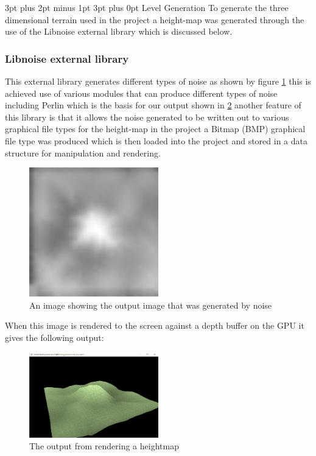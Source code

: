 \documentclass[12pt,a4paper]{article}
\makeatletter
\renewcommand\subsection{\@startsection {subsection}{1}{2mm} %
                               {3pt plus 2pt minus 1pt} %
                               {3pt plus 0pt} %
                               {\normalfont\bfseries}}
\makeatother
\begin{document}
\subsection{Level Generation}
To generate the three dimensional terrain used in the project a height-map was generated through the use of the Libnoise external library which is discussed below.

\subsubsection{Libnoise external library}
This external library generates different types of noise as shown by figure \ref{noise} this is achieved use of various modules that can produce different types of noise including Perlin which is the basis for our output shown in \ref{heightmap} another feature of this library is that it allows the noise generated to be written out to various graphical file types for the height-map in the project a Bitmap (BMP) graphical file type was produced which is then loaded into the project and stored in a data structure for manipulation and rendering.\\
\begin{figure}[ht!]
	\includegraphics[width=0.5\textwidth]{images/heightmaptest}
	\caption{An image showing the output image that was generated by noise}	 \label{noise}
\end{figure}

\pagebreak
When this image is rendered to the screen against a depth buffer on the GPU it gives the following output:
\begin{figure}[ht!]
	\includegraphics[width=0.5\textwidth]{images/Heightmap-output}
	\caption{The output from rendering a heightmap} \label{heightmap}
\end{figure}
\end{document}
